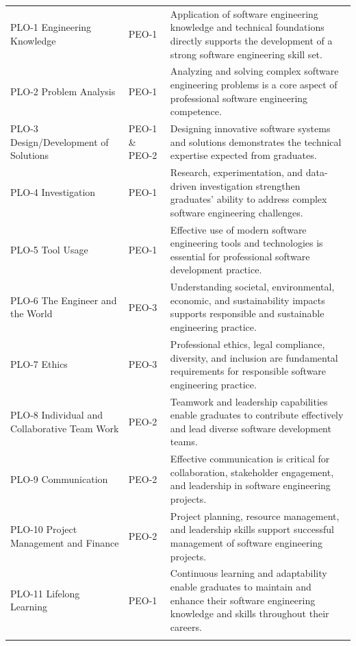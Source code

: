 {\begin{longtable}{>{\raggedright\arraybackslash}p{}
                  >{\centering\arraybackslash}p{}
                  >{\raggedright\arraybackslash}p{}}
PLO-1 Engineering Knowledge        & PEO-1 & Application of software engineering knowledge and technical foundations directly supports the development of a strong software engineering skill set. \\
\addlinespace
PLO-2 Problem Analysis             & PEO-1 & Analyzing and solving complex software engineering problems is a core aspect of professional software engineering competence. \\
\addlinespace
PLO-3 Design/Development of Solutions & PEO-1 \& PEO-2 & Designing innovative software systems and solutions demonstrates the technical expertise expected from graduates. \\
\addlinespace
PLO-4 Investigation                & PEO-1 & Research, experimentation, and data-driven investigation strengthen graduates' ability to address complex software engineering challenges. \\
\addlinespace
PLO-5 Tool Usage                   & PEO-1 & Effective use of modern software engineering tools and technologies is essential for professional software development practice. \\
\addlinespace
PLO-6 The Engineer and the World   & PEO-3 & Understanding societal, environmental, economic, and sustainability impacts supports responsible and sustainable engineering practice. \\
\addlinespace
PLO-7 Ethics                       & PEO-3 & Professional ethics, legal compliance, diversity, and inclusion are fundamental requirements for responsible software engineering practice. \\
\addlinespace
PLO-8 Individual and Collaborative Team Work & PEO-2 & Teamwork and leadership capabilities enable graduates to contribute effectively and lead diverse software development teams. \\
\addlinespace
PLO-9 Communication                & PEO-2 & Effective communication is critical for collaboration, stakeholder engagement, and leadership in software engineering projects. \\
\addlinespace
PLO-10 Project Management and Finance & PEO-2 & Project planning, resource management, and leadership skills support successful management of software engineering projects. \\
\addlinespace
PLO-11 Lifelong Learning           & PEO-1 & Continuous learning and adaptability enable graduates to maintain and enhance their software engineering knowledge and skills throughout their careers. \\
\bottomrule
\label{table:plo-peo_mapping_rationale}
\end{longtable}

}
